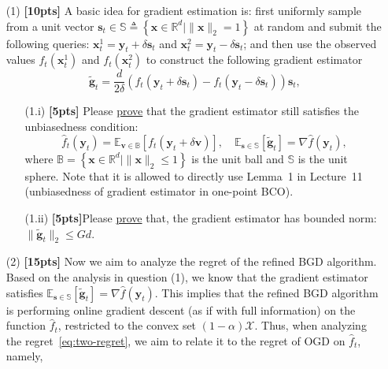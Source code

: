 \documentclass[a4paper]{article}
\numberwithin{equation}{section}
\theoremstyle{definition}
\theoremstyle{definition}
\begin{document}
\begin{enumerate}
  \item[(1)] \textbf{[10pts]} A basic idea for gradient estimation is: first uniformly sample from a unit vector $\mathbf{s}_t \in \mathbb{S} \triangleq \left\{\mathbf{x} \in \mathbb{R}^d \mid\|\mathbf{x}\|_2=1\right\}$ at random and submit the following queries: $\mathbf{x}_t^1 = \mathbf{y}_t + \delta \mathbf{s}_t$ and $\mathbf{x}_t^2 = \mathbf{y}_t - \delta \mathbf{s}_t$; and then use the observed values $f_t(\mathbf{x}_t^1)$ and $f_t(\mathbf{x}_t^2)$ to construct the following gradient estimator
  \begin{equation*}
    \widetilde{\mathbf{g}}_t=\frac{d}{2 \delta}\left(f_t\left(\mathbf{y}_t + \delta \mathbf{s}_t\right)-f_t\left(\mathbf{y}_t - \delta \mathbf{s}_t\right)\right) \mathbf{s}_t,
  \end{equation*}
  \begin{enumerate}
    \item[(1.i)] \textbf{[5pts]}  Please \underline{prove} that the gradient estimator still satisfies the unbiasedness condition:
  \begin{equation*}
  \widehat{f}_t(\mathbf{y}_t) = \mathbb{E}_{\mathbf{v} \in \mathbb{B}}[f_t(\mathbf{y}_t + \delta \mathbf{v})], \quad \mathbb{E}_{\mathbf{s} \in \mathbb{S}}[\widetilde{\mathbf{g}}_t] = \nabla \widehat{f}(\mathbf{y}_t),
  \end{equation*}
  where $\mathbb{B}=\left\{\mathbf{x} \in \mathbb{R}^d \mid\|\mathbf{x}\|_2 \leq 1\right\}$ is the unit ball and $\mathbb{S}$ is the unit sphere. Note that it is allowed to directly use Lemma~1 in Lecture~11 (unbiasedness of gradient estimator in one-point BCO).
  \item[(1.ii)] \textbf{[5pts]}Please \underline{prove} that, the gradient estimator has bounded norm: $\|\widetilde{\mathbf{g}}_t\|_2 \leq Gd$.
\end{enumerate}
  \item[(2)] \textbf{[15pts]} Now we aim to analyze the regret of the refined BGD algorithm. Based on the analysis in question (1), we know that the gradient estimator satisfies $\mathbb{E}_{\mathbf{s} \in \mathbb{S}}[\widetilde{\mathbf{g}}_t] = \nabla \widehat{f}(\mathbf{y}_t)$. This implies that the refined BGD algorithm is performing online gradient descent (as if with full information) on the function $\widehat{f}_t$, restricted to the convex set $(1-\alpha) \mathcal{X}$. Thus, when analyzing the regret~\eqref{eq:two-regret}, we aim to relate it to the regret of OGD on $\widehat{f}_t$, namely,

\end{enumerate}
\end{document}
